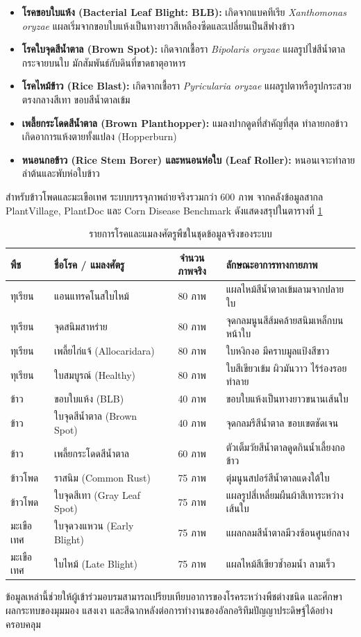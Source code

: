 \begin{itemize}
    \item \textbf{โรคขอบใบแห้ง (Bacterial Leaf Blight: BLB):} เกิดจากแบคทีเรีย \textit{Xanthomonas oryzae} แผลเริ่มจากขอบใบแห้งเป็นทางยาวสีเหลืองซีดและเปลี่ยนเป็นสีฟางข้าว
    \item \textbf{โรคใบจุดสีน้ำตาล (Brown Spot):} เกิดจากเชื้อรา \textit{Bipolaris oryzae} แผลรูปไข่สีน้ำตาลกระจายบนใบ มักสัมพันธ์กับดินที่ขาดธาตุอาหาร
    \item \textbf{โรคไหม้ข้าว (Rice Blast):} เกิดจากเชื้อรา \textit{Pyricularia oryzae} แผลรูปตาหรือรูปกระสวย ตรงกลางสีเทา ขอบสีน้ำตาลเข้ม
    \item \textbf{เพลี้ยกระโดดสีน้ำตาล (Brown Planthopper):} แมลงปากดูดที่สำคัญที่สุด ทำลายกอข้าวเกิดอาการแห้งตายทั้งแปลง (Hopperburn)
    \item \textbf{หนอนกอข้าว (Rice Stem Borer) และหนอนห่อใบ (Leaf Roller):} หนอนเจาะทำลายลำต้นและพับห่อใบข้าว
\end{itemize}

\label{sec:maize_tomato_diagnostics}

สำหรับข้าวโพดและมะเขือเทศ ระบบบรรจุภาพถ่ายจริงรวมกว่า 600 ภาพ จากคลังข้อมูลสากล PlantVillage, PlantDoc และ Corn Disease Benchmark ดังแสดงสรุปในตารางที่ \ref{tab:crops_disease_benchmark}

\begin{table}[htbp]
\caption{รายการโรคและแมลงศัตรูพืชในชุดข้อมูลจริงของระบบ}
\label{tab:crops_disease_benchmark}
\centering
\fontsize{9}{12}\selectfont
\begin{tabularx}{\textwidth}{llcX}
\toprule
\textbf{พืช} & \textbf{ชื่อโรค / แมลงศัตรู} & \textbf{จำนวนภาพจริง} & \textbf{ลักษณะอาการทางกายภาพ} \\
\midrule
ทุเรียน & แอนแทรคโนสใบไหม้ & 80 ภาพ & แผลไหม้สีน้ำตาลเข้มลามจากปลายใบ \\
ทุเรียน & จุดสนิมสาหร่าย & 80 ภาพ & จุดกลมนูนสีส้มคล้ายสนิมเหล็กบนหน้าใบ \\
ทุเรียน & เพลี้ยไก่แจ้ (Allocaridara) & 80 ภาพ & ใบหงิกงอ มีคราบมูลแป้งสีขาว \\
ทุเรียน & ใบสมบูรณ์ (Healthy) & 80 ภาพ & ใบสีเขียวเข้ม ผิวมันวาว ไร้ร่องรอยทำลาย \\
ข้าว & ขอบใบแห้ง (BLB) & 40 ภาพ & ขอบใบแห้งเป็นทางยาวขนานเส้นใบ \\
ข้าว & ใบจุดสีน้ำตาล (Brown Spot) & 40 ภาพ & จุดกลมรีสีน้ำตาล ขอบเขตชัดเจน \\
ข้าว & เพลี้ยกระโดดสีน้ำตาล & 60 ภาพ & ตัวเต็มวัยสีน้ำตาลดูดกินน้ำเลี้ยงกอข้าว \\
ข้าวโพด & ราสนิม (Common Rust) & 75 ภาพ & ตุ่มนูนสปอร์สีน้ำตาลแดงใต้ใบ \\
ข้าวโพด & ใบจุดสีเทา (Gray Leaf Spot) & 75 ภาพ & แผลรูปสี่เหลี่ยมผืนผ้าสีเทาระหว่างเส้นใบ \\
มะเขือเทศ & ใบจุดวงแหวน (Early Blight) & 75 ภาพ & แผลกลมสีน้ำตาลมีวงซ้อนศูนย์กลาง \\
มะเขือเทศ & ใบไหม้ (Late Blight) & 75 ภาพ & แผลไหม้สีเขียวช้ำอมน้ำ ลามเร็ว \\
\bottomrule
\end{tabularx}
\end{table}

ข้อมูลเหล่านี้ช่วยให้ผู้เข้าร่วมอบรมสามารถเปรียบเทียบอาการของโรคระหว่างพืชต่างชนิด และศึกษาผลกระทบของมุมมอง แสงเงา และสีฉากหลังต่อการทำงานของอัลกอริทึมปัญญาประดิษฐ์ได้อย่างครอบคลุม
